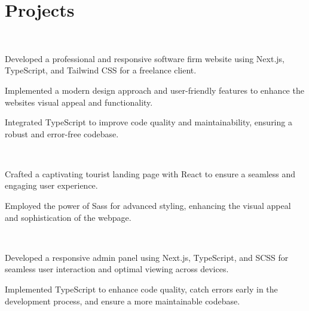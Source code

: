\documentclass[]{deedy-resume-openfont}
\begin{document}
        \section{Projects }
        \vspace{2mm}
        \raggedright
        
            \hfill{}\\
            \begin{tightemize}
\item  Developed a professional and responsive software firm website using Next.js, TypeScript, and Tailwind CSS for a freelance client.
\item  Implemented a modern design approach and user-friendly features to enhance the website\textquotesingle{}s visual appeal and functionality.
\item  Integrated TypeScript to improve code quality and maintainability, ensuring a robust and error-free codebase.
\end{tightemize}
            \sectionsep
          
            \hfill
            \\
            \begin{tightemize}
\item  Crafted a captivating tourist landing page with React to ensure a seamless and engaging user experience.
\item  Employed the power of Sass for advanced styling, enhancing the visual appeal and sophistication of the webpage.
\end{tightemize}
            \sectionsep
            \hfill{}\\
            \begin{tightemize}
\item  Developed a responsive admin panel using Next.js, TypeScript, and SCSS for seamless user interaction and optimal viewing across devices.
\item  Implemented TypeScript to enhance code quality, catch errors early in the development process, and ensure a more maintainable codebase.
\end{tightemize}
            \sectionsep
          
\end{document}
